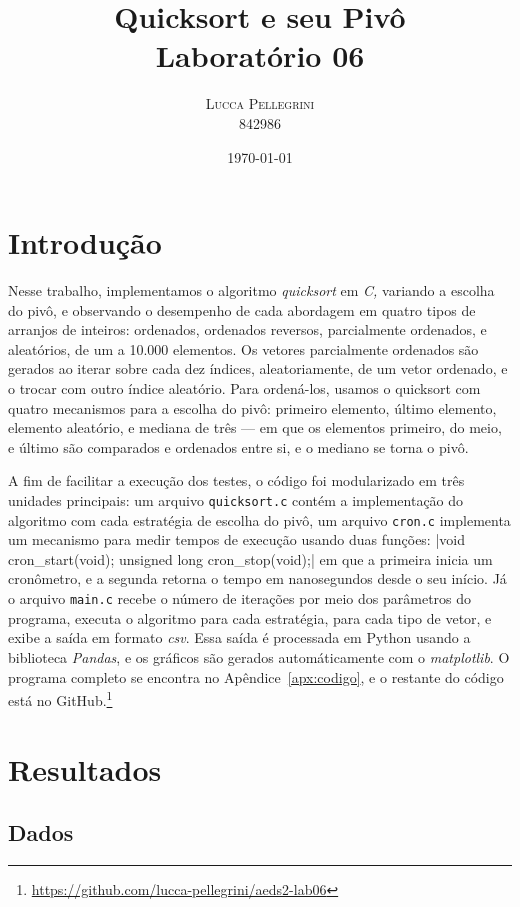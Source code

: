 \documentclass[10pt,oneside,onecolumn]{article}
\title{{\huge\bfseries Quicksort e seu Pivô}\\
Laboratório 06}
\author{ %
	\textsc{Lucca Pellegrini} \\
	\normalsize{842986}
}
\date{\today}
\begin{document}

\maketitle
\section{Introdução}

Nesse trabalho, implementamos o algoritmo \textit{quicksort} em \textit{C,}
variando a escolha do pivô, e observando o desempenho de cada abordagem em
quatro tipos de arranjos de inteiros: ordenados, ordenados reversos,
parcialmente ordenados, e aleatórios, de um a 10.000 elementos. Os vetores
parcialmente ordenados são gerados ao iterar sobre cada dez índices,
aleatoriamente, de um vetor ordenado, e o trocar com outro índice aleatório.
Para ordená-los, usamos o quicksort com quatro mecanismos para a escolha do
pivô: primeiro elemento, último elemento, elemento aleatório, e mediana de três
--- em que os elementos primeiro, do meio, e último são comparados e ordenados
entre si, e o mediano se torna o pivô.

A fim de facilitar a execução dos testes, o código foi modularizado em três
unidades principais: um arquivo \texttt{quicksort.c} contém a implementação do
algoritmo com cada estratégia de escolha do pivô, um arquivo \texttt{cron.c}
implementa um mecanismo para medir tempos de execução usando duas funções:
|void cron_start(void); unsigned long cron_stop(void);| em que a
primeira inicia um cronômetro, e a segunda retorna o tempo em nanosegundos
desde o seu início. Já o arquivo \texttt{main.c} recebe o número de iterações
por meio dos parâmetros do programa, executa o algoritmo para cada estratégia,
para cada tipo de vetor, e exibe a saída em formato \textit{csv}. Essa saída é
processada em Python usando a biblioteca \textit{Pandas}, e os gráficos são
gerados automáticamente com o \textit{matplotlib}. O programa completo se
encontra no Apêndice~\ref{apx:codigo}, e o restante do código está no
GitHub.\footnote{\url{https://github.com/lucca-pellegrini/aeds2-lab06}}

\newpage
\section{Resultados}
\subsection{Dados}
\end{document}

